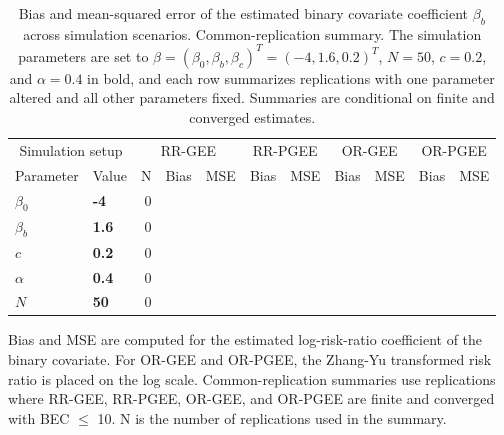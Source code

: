 \begin{table}[htbp]
\centering
\scriptsize
\setlength{\tabcolsep}{4pt}
\renewcommand{\arraystretch}{1.15}
\caption{Bias and mean-squared error of the estimated binary covariate coefficient $\beta_b$ across simulation scenarios. Common-replication summary. The simulation parameters are set to $\beta = (\beta_0, \beta_b, \beta_c)^T = (-4, 1.6, 0.2)^T$, $N = 50$, $c = 0.2$, and $\alpha = 0.4$ in bold, and each row summarizes replications with one parameter altered and all other parameters fixed. Summaries are conditional on finite and converged estimates.}
\begin{tabular}{ll|rrr|rr|rr|rr}
\hline
\multicolumn{2}{c|}{Simulation setup} & \multicolumn{3}{c|}{RR-GEE} & \multicolumn{2}{c|}{RR-PGEE} & \multicolumn{2}{c|}{OR-GEE} & \multicolumn{2}{c}{OR-PGEE} \\
Parameter & Value & N & Bias & MSE & Bias & MSE & Bias & MSE & Bias & MSE \\
\hline
$\beta_0$ & \textbf{-4} & 0 &  &  &  &  &  &  &  &  \\
\hline
$\beta_b$ & \textbf{1.6} & 0 &  &  &  &  &  &  &  &  \\
\hline
$c$ & \textbf{0.2} & 0 &  &  &  &  &  &  &  &  \\
\hline
$\alpha$ & \textbf{0.4} & 0 &  &  &  &  &  &  &  &  \\
\hline
$N$ & \textbf{50} & 0 &  &  &  &  &  &  &  &  \\
\hline
\end{tabular}
\begin{flushleft}
\footnotesize Bias and MSE are computed for the estimated log-risk-ratio coefficient of the binary covariate. For OR-GEE and OR-PGEE, the Zhang-Yu transformed risk ratio is placed on the log scale. Common-replication summaries use replications where RR-GEE, RR-PGEE, OR-GEE, and OR-PGEE are finite and converged with BEC $\leq$ 10. N is the number of replications used in the summary.
\end{flushleft}
\end{table}

